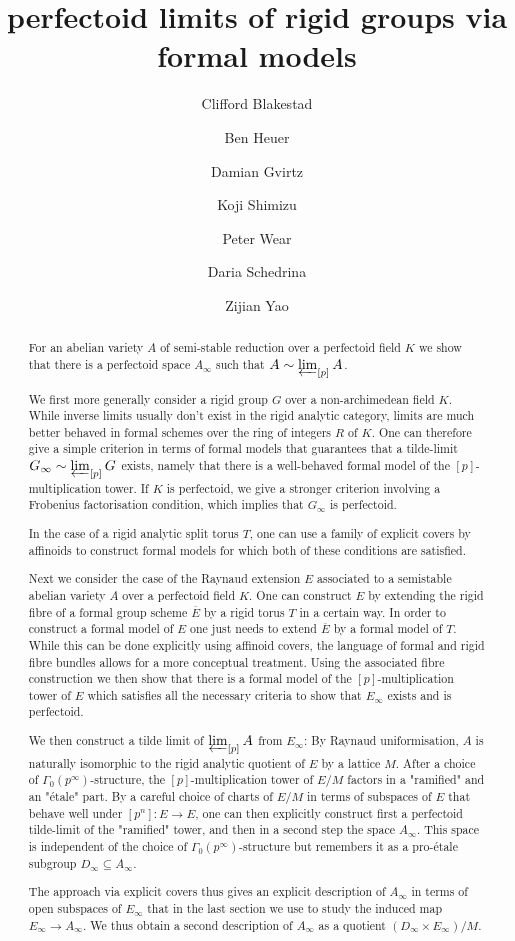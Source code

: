 \documentclass[11pt,oneside]{amsart}
\title[perfectoid limits of rigid groups via formal models]{perfectoid limits of rigid groups via formal models}
\author{
	Clifford Blakestad \and
	Ben Heuer \and 
	Damian Gvirtz \and
	Koji Shimizu \and 
	Peter Wear \and
	Daria Schedrina \and
	Zijian Yao}
\theoremstyle{definition}
\theoremstyle{remark}
\begin{document}
	
	\maketitle
	
	\begin{abstract}
		For an abelian variety $A$ of semi-stable reduction over a perfectoid field $K$ we show that there is a perfectoid space $A_\infty$ such that $A\sim\varprojlim_{[p]}A$. 
		
		We first more generally consider a rigid group  $G$ over a non-archimedean field $K$. While inverse limits usually don't exist in the rigid analytic category, limits are much better behaved in formal schemes over the ring of integers $R$ of $K$. One can therefore give a simple criterion in terms of formal models that guarantees that a tilde-limit $G_\infty \sim\varprojlim_{[p]} G$ exists, namely that there is a well-behaved formal model of the $[p]$-multiplication tower.
		If $K$ is perfectoid, we give a stronger criterion involving a Frobenius factorisation condition, which implies that $G_\infty$ is perfectoid.
		
		In the case of a rigid analytic split torus $T$, one can use a family of explicit covers by affinoids to construct formal models for which both of these conditions are satisfied. 
		
		Next we consider the case of the Raynaud extension $E$ associated to a semistable abelian variety $A$ over a perfectoid field $K$. One can construct $E$ by extending the rigid fibre of a formal group scheme $\overline{E}$ by a rigid torus $T$ in a certain way. In order to construct a formal model of $E$ one just needs to extend $\overline{E}$ by a formal model of $T$. While this can be done explicitly using affinoid covers, the language of formal and rigid fibre bundles allows for a more conceptual treatment. Using the associated fibre construction we then show that there is a formal model of the $[p]$-multiplication tower of $E$ which satisfies all the necessary criteria to show that $E_\infty$ exists and is perfectoid.  
		
		We then construct a tilde limit of $\varprojlim_{[p]} A$ from $E_\infty$: By Raynaud uniformisation, $A$ is naturally isomorphic to the rigid analytic quotient of $E$ by a lattice $M$. After a choice of $\Gamma_0(p^\infty)$-structure, the $[p]$-multiplication tower of $E/M$ factors in a "ramified" and an "\'etale" part. By a careful choice of charts of $E/M$ in terms of subspaces of $E$ that behave well under $[p^n]:E\rightarrow E$, one can then explicitly construct first a perfectoid tilde-limit of the "ramified" tower, and then in a second step the space $A_\infty$. This space is independent of the choice of $\Gamma_0(p^\infty)$-structure but remembers it as a pro-\'etale subgroup $D_\infty \subseteq A_\infty$.
		
		The approach via explicit covers thus gives an explicit description of $A_\infty$ in terms of open subspaces of $E_\infty$ that in the last section we use to study the induced map $E_\infty\rightarrow A_\infty$. We thus obtain a second description of $A_\infty$ as a quotient $(D_\infty\times E_\infty)/M$.
		
	\end{abstract}
	\tableofcontents
\end{document}
